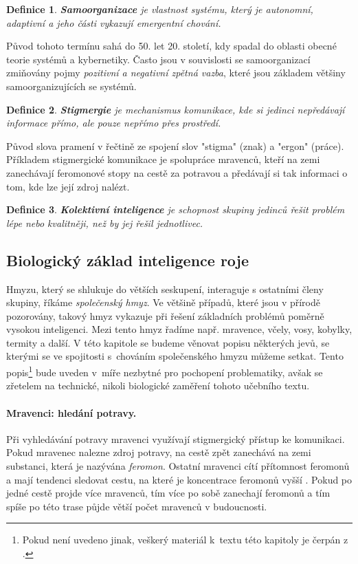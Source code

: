 \documentclass[a4paper,12pt]{article}
\newtheorem{define}{Definice}
\begin{document}
\begin{define}
  {\bf Samoorganizace} je vlastnost systému, který je autonomní, adaptivní a jeho 
  části vykazují emergentní chování. \cite{Wuchner07}
\end{define}
Původ tohoto termínu sahá do 50. let 20. století, kdy spadal do oblasti obecné teorie
systémů a kybernetiky. Často jsou v souvislosti se samoorganizací zmiňovány pojmy
{\it pozitivní a negativní zpětná vazba}, které jsou základem většiny samoorganizujících
se systémů.

\begin{define}
  {\bf Stigmergie} je mechanismus komunikace, kde si jedinci nepředávají informace přímo,
  ale pouze nepřímo přes prostředí. \cite[s.6]{Heylighen99}
\end{define}
Původ slova pramení v řečtině ze spojení slov "stigma" (znak) a "ergon" (práce). Příkladem
stigmergické komunikace je spolupráce mravenců, kteří na zemi zanechávají feromonové stopy
na cestě za potravou a předávají si tak informaci o tom, kde lze její zdroj nalézt.

\begin{define}
  {\bf Kolektivní inteligence} je schopnost skupiny jedinců řešit problém lépe nebo kvalitněji,
  než by jej řešil jednotlivec. \cite[s.1]{Heylighen99}
\end{define}


\subsection{Biologický základ inteligence roje} \label{sub:biolzakl}
Hmyzu, který se shlukuje do větších seskupení, interaguje s ostatními členy skupiny,
říkáme {\it společenský hmyz}. Ve většině případů, které jsou v přírodě pozorovány,
takový hmyz vykazuje při řešení základních problémů poměrně vysokou inteligenci. Mezi
tento hmyz řadíme např. mravence, včely, vosy, kobylky, termity a další. V této
kapitole se budeme věnovat popisu některých jevů, se kterými se ve spojitosti s~chováním
společenského hmyzu můžeme setkat. Tento popis\footnote{Pokud není uvedeno jinak, veškerý
materiál k~textu této kapitoly je čerpán z \cite{Beekman08SwarmBio}.} bude uveden v~míře
nezbytné pro pochopení problematiky, avšak se zřetelem na technické, nikoli biologické
zaměření tohoto učebního textu.

\paragraph{Mravenci: hledání potravy.}
Při vyhledávání potravy mravenci využívají stigmergický přístup ke komunikaci. Pokud mravenec
nalezne zdroj potravy, na cestě zpět zanechává na zemi substanci, která je nazývána {\it feromon}.
Ostatní mravenci cítí přítomnost feromonů a mají tendenci sledovat cestu, na které je koncentrace
feromonů vyšší \cite{Dorigo06antcolony}. Pokud po jedné cestě projde více mravenců, tím více po
sobě zanechají feromonů a tím spíše po této trase půjde větší počet mravenců v budoucnosti.
\end{document}
